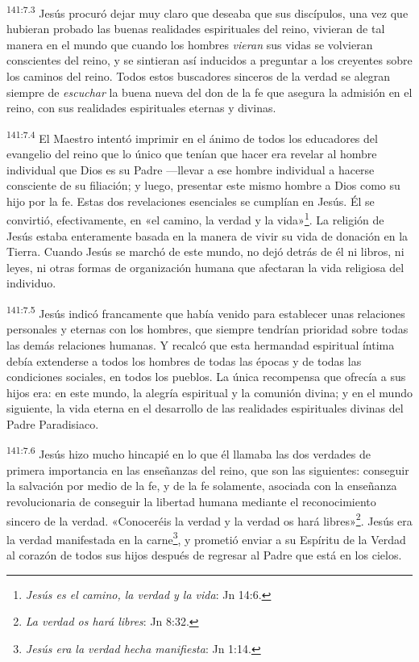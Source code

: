\par
\textsuperscript{141:7.3} Jesús procuró dejar muy claro que deseaba que sus discípulos, una vez que hubieran probado las buenas realidades espirituales del reino, vivieran de tal manera en el mundo que cuando los hombres \textit{vieran} sus vidas se volvieran conscientes del reino, y se sintieran así inducidos a preguntar a los creyentes sobre los caminos del reino. Todos estos buscadores sinceros de la verdad se alegran siempre de \textit{escuchar} la buena nueva del don de la fe que asegura la admisión en el reino, con sus realidades espirituales eternas y divinas.

\par
\textsuperscript{141:7.4} El Maestro intentó imprimir en el ánimo de todos los educadores del evangelio del reino que lo único que tenían que hacer era revelar al hombre individual que Dios es su Padre ---llevar a ese hombre individual a hacerse consciente de su filiación; y luego, presentar este mismo hombre a Dios como su hijo por la fe. Estas dos revelaciones esenciales se cumplían en Jesús. Él se convirtió, efectivamente, en «el camino, la verdad y la vida»\footnote{\textit{Jesús es el camino, la verdad y la vida}: Jn 14:6.}. La religión de Jesús estaba enteramente basada en la manera de vivir su vida de donación en la Tierra. Cuando Jesús se marchó de este mundo, no dejó detrás de él ni libros, ni leyes, ni otras formas de organización humana que afectaran la vida religiosa del individuo.

\par
\textsuperscript{141:7.5} Jesús indicó francamente que había venido para establecer unas relaciones personales y eternas con los hombres, que siempre tendrían prioridad sobre todas las demás relaciones humanas. Y recalcó que esta hermandad espiritual íntima debía extenderse a todos los hombres de todas las épocas y de todas las condiciones sociales, en todos los pueblos. La única recompensa que ofrecía a sus hijos era: en este mundo, la alegría espiritual y la comunión divina; y en el mundo siguiente, la vida eterna en el desarrollo de las realidades espirituales divinas del Padre Paradisiaco.

\par
\textsuperscript{141:7.6} Jesús hizo mucho hincapié en lo que él llamaba las dos verdades de primera importancia en las enseñanzas del reino, que son las siguientes: conseguir la salvación por medio de la fe, y de la fe solamente, asociada con la enseñanza revolucionaria de conseguir la libertad humana mediante el reconocimiento sincero de la verdad. «Conoceréis la verdad y la verdad os hará libres»\footnote{\textit{La verdad os hará libres}: Jn 8:32.}. Jesús era la verdad manifestada en la carne\footnote{\textit{Jesús era la verdad hecha manifiesta}: Jn 1:14.}, y prometió enviar a su Espíritu de la Verdad al corazón de todos sus hijos después de regresar al Padre que está en los cielos.

